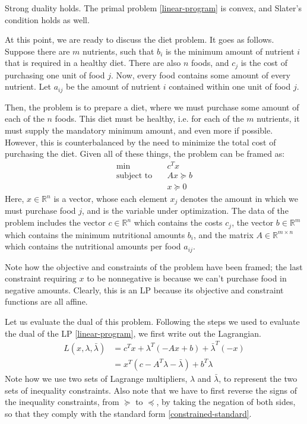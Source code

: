 \documentclass[a4paper]{article}
\theoremstyle{definition}
\begin{document}
Strong duality holds.
The primal problem \eqref{linear-program} is convex, and Slater's condition holds as well.

At this point, we are ready to discuss the diet problem.
It goes as follows.
Suppose there are $m$ nutrients, such that $b_i$ is the minimum amount of nutrient $i$ that is required in a healthy diet.
There are also $n$ foods, and $c_j$ is the cost of purchasing one unit of food $j$.
Now, every food contains some amount of every nutrient.
Let $a_{ij}$ be the amount of nutrient $i$ contained within one unit of food $j$.

Then, the problem is to prepare a diet, where we must purchase some amount of each of the $n$ foods.
This diet must be healthy, i.e. for each of the $m$ nutrients, it must supply the mandatory minimum amount, and even more if possible.
However, this is counterbalanced by the need to minimize the total cost of purchasing the diet.
Given all of these things, the problem can be framed as:
\begin{align*}
	\min \quad & c^T x \\
	\text{subject to} \quad & Ax \succeq b \\
	& x \succeq 0
\end{align*}
Here, $x \in \mathbb{R}^n$ is a vector, whose each element $x_j$ denotes the amount in which we must purchase food $j$, and is the variable under optimization.
The data of the problem includes the vector $c \in \mathbb{R}^n$ which contains the costs $c_j$, the vector $b \in \mathbb{R}^m$ which contains the minimum nutritional amounts $b_i$, and the matrix $A \in \mathbb{R}^{m \times n}$ which contains the nutritional amounts per food $a_{ij}$.

Note how the objective and constraints of the problem have been framed; the last constraint requiring $x$ to be nonnegative is because we can't purchase food in negative amounts.
Clearly, this is an LP because its objective and constraint functions are all affine.

Let us evaluate the dual of this problem.
Following the steps we used to evaluate the dual of the LP \eqref{linear-program}, we first write out the Lagrangian.
\begin{align*}
	L(x, \lambda, \bar{\lambda}) & = c^T x + \lambda^T (- Ax + b) + \bar{\lambda}^T (-x) \\
	& = x^T (c - A^T \lambda - \bar{\lambda}) + b^T \lambda
\end{align*}
Note how we use two sets of Lagrange multipliers, $\lambda$ and $\bar{\lambda}$, to represent the two sets of inequality constraints.
Also note that we have to first reverse the signs of the inequality constraints, from $\succeq$ to $\preceq$, by taking the negation of both sides, so that they comply with the standard form \eqref{constrained-standard}.
\end{document}
